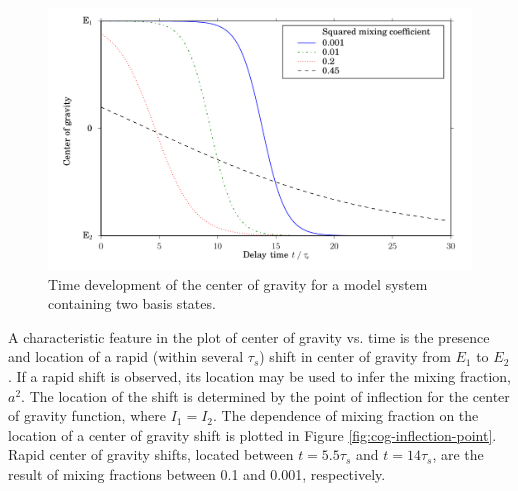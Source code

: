\begin{figure}
  \caption{Time development of the center of gravity for a model
    system containing two basis states.}
  \label{fig:cog-devel}
  \centering
  \includegraphics[width=6in]{cog-development.pdf}
\end{figure}

A characteristic feature in the plot of center of gravity vs. time is
the presence and location of a rapid (within several $\tau_s$) shift
in center of gravity from $E_1$ to $E_2$.  If a rapid shift is
observed, its location may be used to infer the mixing fraction,
$a^2$.  The location of the shift is determined by the point of
inflection for the center of gravity function, where $I_1=I_2$.  The
dependence of mixing fraction on the location of a center of gravity
shift is plotted in Figure \ref{fig:cog-inflection-point}.  Rapid
center of gravity shifts, located between $t=5.5\tau_s$ and
$t=14\tau_s$, are the result of mixing fractions between 0.1 and 0.001,
respectively.

